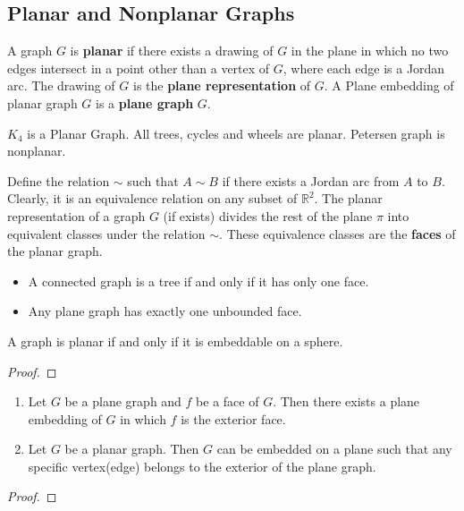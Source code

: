 \subsection{Planar and Nonplanar Graphs}
\begin{definition}
	A graph $G$ is \textbf{planar} if there exists a drawing of $G$ in the plane in which no two edges intersect in a point other than a vertex of $G$, where each edge is a Jordan arc. The drawing of $G$ is the \textbf{plane representation} of $G$.
	A Plane embedding of planar graph $G$ is a \textbf{plane graph} $G$.
\end{definition}

\begin{example}
	$K_4$ is a Planar Graph. All trees, cycles and wheels are planar. Petersen graph is nonplanar.
\end{example}

\begin{definition}
	Define the relation $\sim$ such that $A \sim B$ if there exists a Jordan arc from $A$ to $B$. Clearly, it is an equivalence relation on any subset of $\mathbb{R}^2$.
	The planar representation of a graph $G$ (if exists) divides the rest of the plane $\pi$ into equivalent classes under the relation $\sim$. These equivalence classes are the \textbf{faces} of the planar graph.
\end{definition}

\begin{remark}
\begin{itemize}
	\item A connected graph is a tree if and only if it has only one face.
	\item Any plane graph has exactly one unbounded face.
\end{itemize}
\end{remark}

\begin{theorem}
	A graph is planar if and only if it is embeddable on a sphere.
\end{theorem}
\begin{proof}
\end{proof}

\begin{theorem}
\begin{enumerate}
	\item Let $G$ be a plane graph and $f$ be a face of $G$. Then there exists a plane embedding of $G$ in which $f$ is the exterior face.
	\item Let $G$ be a planar graph. Then $G$ can be embedded on a plane such that any specific vertex(edge) belongs to the exterior of the plane graph.
\end{enumerate}
\end{theorem}
\begin{proof}
\end{proof}

